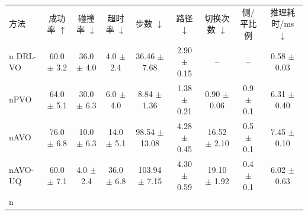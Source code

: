 \begin{tabular}{lcccccccc}
\toprule
方法 & 成功率 $\uparrow$ & 碰撞率 $\downarrow$ & 超时率 $\downarrow$ & 步数 $\downarrow$ & 路径 $\downarrow$ & 切换次数 $\downarrow$ & 侧/平比例 & 推理耗时/ms $\downarrow$ \\n\midrule
DRL-VO & 60.0 $\pm$ 3.2 & 36.0 $\pm$ 4.0 & 4.0 $\pm$ 2.4 & 36.46 $\pm$ 7.68 & 2.90 $\pm$ 0.15 & -- & -- & 0.58 $\pm$ 0.03 \\nPVO & 64.0 $\pm$ 5.1 & 30.0 $\pm$ 6.3 & 6.0 $\pm$ 4.0 & 8.84 $\pm$ 1.36 & 1.38 $\pm$ 0.21 & 0.90 $\pm$ 0.06 & 0.9 $\pm$ 0.1 & 6.31 $\pm$ 0.40 \\nAVO & 76.0 $\pm$ 6.8 & 10.0 $\pm$ 6.3 & 14.0 $\pm$ 5.1 & 98.54 $\pm$ 13.08 & 4.28 $\pm$ 0.45 & 16.52 $\pm$ 2.10 & 0.5 $\pm$ 0.1 & 7.45 $\pm$ 0.10 \\nAVO-UQ & 60.0 $\pm$ 7.1 & 4.0 $\pm$ 2.4 & 36.0 $\pm$ 6.8 & 103.94 $\pm$ 7.15 & 4.30 $\pm$ 0.59 & 19.10 $\pm$ 1.92 & 0.4 $\pm$ 0.1 & 6.02 $\pm$ 0.63 \\n\bottomrule
\end{tabular}
